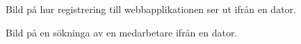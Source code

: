 \documentclass[a4paper,12pt]{article}
\begin{document}
 \begin{figure}[H]
   \centering
   \caption{Bild på hur registrering till webbapplikationen ser ut ifrån en dator.}
   \label{fig:comp_sign_in}
 \end{figure}

 \begin{figure}[H]
   \centering
   \caption{Bild på en sökninga av en medarbetare ifrån en dator.}
   \label{fig:comp_search}
 \end{figure}
 \leavevmode
\end{document}

